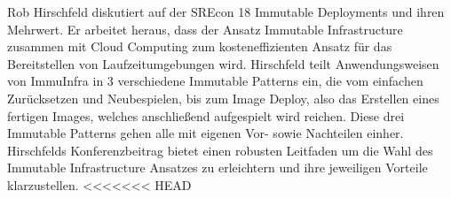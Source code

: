\documentclass[11pt]{scrartcl}
\newcommand{\qto}[1]{\glqq #1\grqq}				%
\newcommand{\zB}{\mbox{z.\,B.}\xspace}
\newcommand{\ggf}{ggf.\xspace}
\newcommand{\bzw}{bzw.\xspace}
\begin{document}
Rob Hirschfeld \cite{Hirschfeld:2018} diskutiert auf der SREcon 18 Immutable Deployments und ihren Mehrwert. Er arbeitet heraus, dass der Ansatz Immutable Infrastructure zusammen mit Cloud Computing zum kosteneffizienten Ansatz für das Bereitstellen von Laufzeitumgebungen wird. Hirschfeld teilt Anwendungsweisen von ImmuInfra in 3 verschiedene Immutable Patterns ein, die vom einfachen Zurücksetzen und Neubespielen, bis zum Image Deploy, also das Erstellen eines fertigen Images, welches anschließend aufgespielt wird reichen. Diese drei Immutable Patterns gehen alle mit eigenen Vor- sowie Nachteilen einher. Hirschfelds Konferenzbeitrag bietet einen robusten Leitfaden um die Wahl des Immutable Infrastructure Ansatzes zu erleichtern und ihre jeweiligen Vorteile klarzustellen.
<<<<<<< HEAD
%
%
%	
\end{document}
